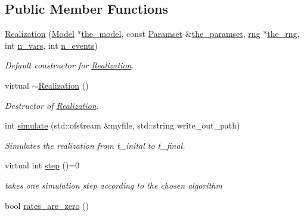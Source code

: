 \subsection*{Public Member Functions}
\begin{DoxyCompactItemize}
\item 
\hyperlink{class_realization_af4cfb6f2221bef9ba5ad09564796677f}{Realization} (\hyperlink{class_model}{Model} $\ast$\hyperlink{class_realization_a47ec1d062b8caee874b08c1a17d6aeeb}{the\+\_\+model}, const \hyperlink{class_paramset}{Paramset} \&\hyperlink{class_realization_a119bb29de88929bc51bc1b329473a94b}{the\+\_\+paramset}, \hyperlink{classrng}{rng} $\ast$\hyperlink{class_realization_ac8d358d929afae90cf5790675b6744f9}{the\+\_\+rng}, int \hyperlink{class_realization_ad9951a0829e68e12fcb3817735bb5097}{n\+\_\+vars}, int \hyperlink{class_realization_afb711282bef806fc0020f91252d1df2c}{n\+\_\+events})
\begin{DoxyCompactList}\small\item\em Default constructor for \hyperlink{class_realization}{Realization}. \end{DoxyCompactList}\item 
virtual \hyperlink{class_realization_a040c39b39c5057c668bd264b4329f2b4}{$\sim$\+Realization} ()
\begin{DoxyCompactList}\small\item\em Destructor of \hyperlink{class_realization}{Realization}. \end{DoxyCompactList}\item 
int \hyperlink{class_realization_a72c7179b0a27d84aa30bace768a05e99}{simulate} (std\+::ofstream \&myfile, std\+::string write\+\_\+out\+\_\+path)
\begin{DoxyCompactList}\small\item\em Simulates the realization from t\+\_\+inital to t\+\_\+final. \end{DoxyCompactList}\item 
\mbox{\label{class_realization_a9949217117927b149850288f3b74c9ef}} 
virtual int \hyperlink{class_realization_a9949217117927b149850288f3b74c9ef}{step} ()=0
\begin{DoxyCompactList}\small\item\em takes one simulation step according to the chosen algorithm \end{DoxyCompactList}\item 
bool \hyperlink{class_realization_a48953442ebf235cd1e02731c7419f65f}{rates\+\_\+are\+\_\+zero} ()

\end{DoxyCompactItemize}
